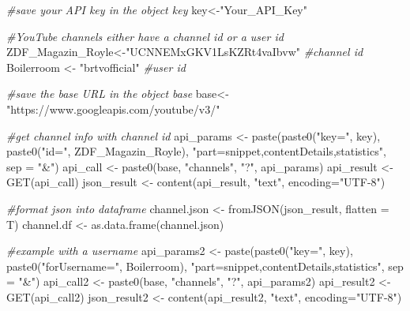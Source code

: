 \documentclass[
]{book}
\newenvironment{Shaded}{\begin{snugshade}}{\end{snugshade}}
\newcommand{\AttributeTok}[1]{\textcolor[rgb]{0.77,0.63,0.00}{#1}}
\newcommand{\CommentTok}[1]{\textcolor[rgb]{0.56,0.35,0.01}{\textit{#1}}}
\newcommand{\FunctionTok}[1]{\textcolor[rgb]{0.00,0.00,0.00}{#1}}
\newcommand{\NormalTok}[1]{#1}
\newcommand{\OtherTok}[1]{\textcolor[rgb]{0.56,0.35,0.01}{#1}}
\newcommand{\StringTok}[1]{\textcolor[rgb]{0.31,0.60,0.02}{#1}}
\begin{document}
\begin{Shaded}
\begin{Highlighting}[]
\CommentTok{\#save your API key in the object key}
\NormalTok{key}\OtherTok{\textless{}{-}}\StringTok{"Your\_API\_Key"}

\CommentTok{\#YouTube channels either have a channel id or a user id}
\NormalTok{ZDF\_Magazin\_Royle}\OtherTok{\textless{}{-}}\StringTok{"UCNNEMxGKV1LsKZRt4vaIbvw"} \CommentTok{\#channel id}
\NormalTok{Boilerroom }\OtherTok{\textless{}{-}} \StringTok{"brtvofficial"} \CommentTok{\#user id}

\CommentTok{\#save the base URL in the object base}
\NormalTok{base}\OtherTok{\textless{}{-}} \StringTok{"https://www.googleapis.com/youtube/v3/"}

\CommentTok{\#get channel info with channel id}
\NormalTok{api\_params }\OtherTok{\textless{}{-}} 
  \FunctionTok{paste}\NormalTok{(}\FunctionTok{paste0}\NormalTok{(}\StringTok{"key="}\NormalTok{, key), }
        \FunctionTok{paste0}\NormalTok{(}\StringTok{"id="}\NormalTok{, ZDF\_Magazin\_Royle), }
        \StringTok{"part=snippet,contentDetails,statistics"}\NormalTok{,}
        \AttributeTok{sep =} \StringTok{"\&"}\NormalTok{)}
\NormalTok{api\_call }\OtherTok{\textless{}{-}} \FunctionTok{paste0}\NormalTok{(base, }\StringTok{"channels"}\NormalTok{, }\StringTok{"?"}\NormalTok{, api\_params)}
\NormalTok{api\_result }\OtherTok{\textless{}{-}} \FunctionTok{GET}\NormalTok{(api\_call)}
\NormalTok{json\_result }\OtherTok{\textless{}{-}} \FunctionTok{content}\NormalTok{(api\_result, }\StringTok{"text"}\NormalTok{, }\AttributeTok{encoding=}\StringTok{"UTF{-}8"}\NormalTok{)}

\CommentTok{\#format json into dataframe}
\NormalTok{channel.json }\OtherTok{\textless{}{-}} \FunctionTok{fromJSON}\NormalTok{(json\_result, }\AttributeTok{flatten =}\NormalTok{ T)}
\NormalTok{channel.df }\OtherTok{\textless{}{-}} \FunctionTok{as.data.frame}\NormalTok{(channel.json)}

\CommentTok{\#example with a username}
\NormalTok{api\_params2 }\OtherTok{\textless{}{-}} 
  \FunctionTok{paste}\NormalTok{(}\FunctionTok{paste0}\NormalTok{(}\StringTok{"key="}\NormalTok{, key), }
        \FunctionTok{paste0}\NormalTok{(}\StringTok{"forUsername="}\NormalTok{, Boilerroom), }
        \StringTok{"part=snippet,contentDetails,statistics"}\NormalTok{,}
        \AttributeTok{sep =} \StringTok{"\&"}\NormalTok{)}
\NormalTok{api\_call2 }\OtherTok{\textless{}{-}} \FunctionTok{paste0}\NormalTok{(base, }\StringTok{"channels"}\NormalTok{, }\StringTok{"?"}\NormalTok{, api\_params2)}
\NormalTok{api\_result2 }\OtherTok{\textless{}{-}} \FunctionTok{GET}\NormalTok{(api\_call2)}
\NormalTok{json\_result2 }\OtherTok{\textless{}{-}} \FunctionTok{content}\NormalTok{(api\_result2, }\StringTok{"text"}\NormalTok{, }\AttributeTok{encoding=}\StringTok{"UTF{-}8"}\NormalTok{)}


\end{Highlighting}
\end{Shaded}
\end{document}
